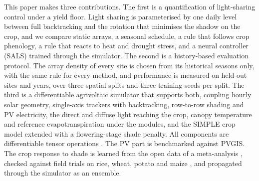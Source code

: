 This paper makes three contributions. The first is a quantification of light-sharing control under a yield floor. Light sharing is parameterised by one daily level between full backtracking and the rotation that minimises the shadow on the crop, and we compare static arrays, a seasonal schedule, a rule that follows crop phenology, a rule that reacts to heat and drought stress, and a neural controller (SALS) trained through the simulator. The second is a history-based evaluation protocol. The array density of every site is chosen from its historical seasons only, with the same rule for every method, and performance is measured on held-out sites and years, over three spatial splits and three training seeds per split. The third is a differentiable agrivoltaic simulator that supports both, coupling hourly solar geometry, single-axis trackers with backtracking, row-to-row shading and PV electricity, the direct and diffuse light reaching the crop, canopy temperature and reference evapotranspiration under the modules, and the SIMPLE crop model \citep{zhao2019} extended with a flowering-stage shade penalty. All components are differentiable tensor operations \citep{karniadakis2021}. The PV part is benchmarked against PVGIS. The crop response to shade is learned from the open data of a meta-analysis \citep{laub2022}, checked against field trials on rice, wheat, potato and maize \citep{gonocruz2021,weselek2021,ramosfuentes2023}, and propagated through the simulator as an ensemble.

